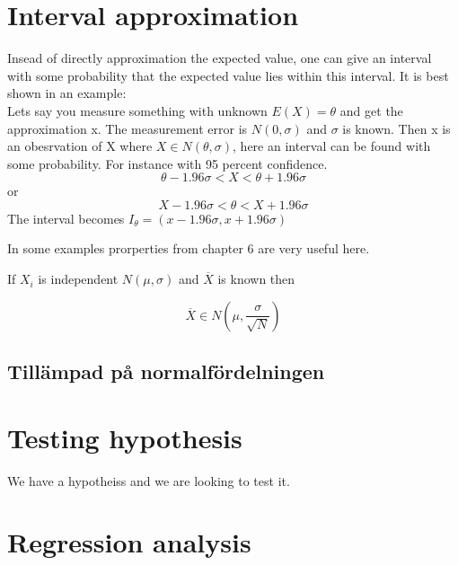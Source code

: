 \documentclass{article}
\begin{document}
\section{Interval approximation}
    Insead of directly approximation the expected value, one can give an interval
    with some probability that the expected value lies within this interval.
    It is best shown in an example:\\
    Lets say you measure something with unknown $E(X) = \theta$ and get the
    approximation x. The measurement error is $N(0,\sigma)$ and $\sigma$ is known.
    Then x is an obesrvation of X where $X \in N(\theta, \sigma)$, here 
    an interval can be found with some probability. For instance with 95 percent confidence.
    \[\theta - 1.96\sigma < X < \theta + 1.96\sigma\]
    or
    \[X - 1.96\sigma < \theta < X + 1.96\sigma\]
    The interval becomes $I_{\theta} = (x - 1.96\sigma, x+1.96\sigma)$
    
    In some examples prorperties from chapter 6 are very useful here. 

    \begin{tcolorbox}

        If $X_i$ is independent $N(\mu,\sigma)$ and $\overline{X}$ is known then

        \[
            \overline{X} \in N(\mu, \frac{\sigma}{\sqrt{N}})
        \]

    \end{tcolorbox}

    \subsection{Tillämpad på normalfördelningen}

\section{Testing hypothesis}
    We have a hypotheiss and we are looking to test it. 
\section{Regression analysis}
\end{document}
